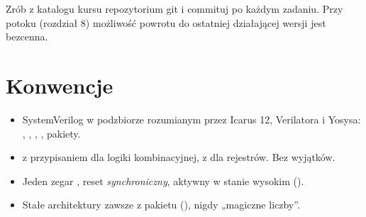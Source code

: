 \begin{uwaga}[Rada]
Zrób z katalogu kursu repozytorium git i commituj po każdym zadaniu. Przy
potoku (rozdział 8) możliwość powrotu do ostatniej działającej wersji jest
bezcenna.
\end{uwaga}

\section*{Konwencje}

\begin{itemize}
  \item SystemVerilog w podzbiorze rozumianym przez Icarus 12, Verilatora i
    Yosysa: , , ,
    , pakiety.
  \item {} z przypisaniem \code{=} dla logiki kombinacyjnej,
     z \code{<=} dla rejestrów. Bez wyjątków.
  \item Jeden zegar , reset \emph{synchroniczny}, aktywny w stanie
    wysokim ().
  \item Stałe architektury zawsze z pakietu 
    (), nigdy „magiczne liczby”.
\end{itemize}
